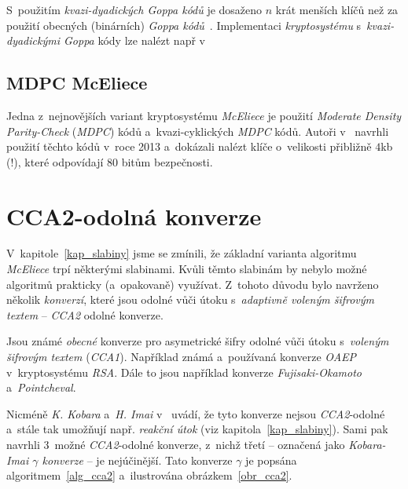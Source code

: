 \documentclass[thesis=M,czech,hidelinks]{FITthesis}[2012/06/26]
\newcommand{\0}{{\textcolor[gray]{0.75}{0}}}
\begin{document}
S~použitím \emph{kvazi-dyadických Goppa kódů} je dosaženo $n$ krát menších klíčů
než za použití obecných (binárních) \emph{Goppa kódů}~\cite{Misoczki1}.
Implementaci \emph{kryptosystému} s~\emph{kvazi-dyadickými Goppa} kódy lze
nalézt např v~\cite{Paustjan,Kratochvil}


\subsection{MDPC McEliece}\label{kap_MDPC}

Jedna z~nejnovějších variant kryptosystému \emph{McEliece} je použití
\emph{Moderate Density Parity-Check} (\emph{MDPC}) kódů a~kvazi-cyklických
\emph{MDPC} kódů.  Autoři v~\cite{Misoczki2} navrhli použití těchto kódů v~roce
2013 a~dokázali nalézt klíče o~velikosti přibližně $4$\;kb (!), které odpovídají
$80$ bitům bezpečnosti.



\section{CCA2-odolná konverze}\label{kap_cca2}

V~kapitole~\ref{kap_slabiny} jsme se zmínili, že základní varianta algoritmu
\emph{McEliece} trpí některými slabinami. Kvůli těmto slabinám by nebylo možné
algoritmů prakticky (a~opakovaně) využívat. Z~tohoto důvodu bylo navrženo
několik \emph{konverzí}, které jsou odolné vůči útoku s~\emph{adaptivně voleným
šifrovým textem} -- \emph{CCA2} odolné konverze.

Jsou známé \emph{obecné} konverze pro asymetrické šifry odolné vůči útoku
s~\emph{voleným šifrovým textem} (\emph{CCA1}). Například známá a~používaná
konverze \emph{OAEP} v~kryptosystému \emph{RSA}. Dále to jsou například konverze
\emph{Fujisaki-Okamoto} a~\emph{Pointcheval}.

Nicméně \emph{K. Kobara} a~\emph{H. Imai} v~\cite{Kobara} uvádí, že tyto
konverze nejsou \emph{CCA2}-odolné a~stále tak umožňují např. \emph{reakční
útok} (viz kapitola~\ref{kap_slabiny}). Sami pak navrhli 3~možné
\emph{CCA2}-odolné konverze, z~nichž třetí -- označená jako \emph{Kobara-Imai
$\gamma$ konverze} -- je nejúčinější. Tato konverze $\gamma$ je popsána
algoritmem~\ref{alg_cca2} a~ilustrována obrázkem~\ref{obr_cca2}.
\end{document}
